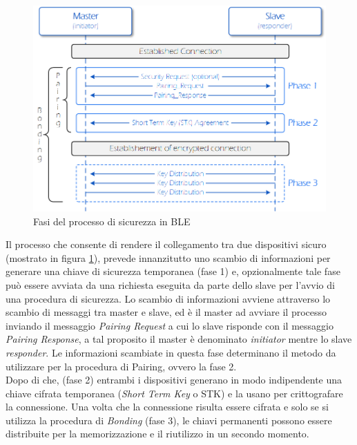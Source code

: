 \begin{figure}[!ht]
    \centering
    \includegraphics[width = \textwidth]{images/Pairing and Bonding.png}
    \caption{Fasi del processo di sicurezza in BLE}
    \label{fig:phasis_pairing_bonding}
\end{figure}

\noindent Il processo che consente di rendere il collegamento tra due dispositivi sicuro (mostrato in figura \ref{fig:phasis_pairing_bonding}), prevede innanzitutto uno scambio di informazioni per generare una chiave di sicurezza temporanea (fase 1) e, opzionalmente tale fase può essere avviata da una richiesta eseguita da parte dello slave per l'avvio di una procedura di sicurezza. Lo scambio di informazioni avviene attraverso lo scambio di messaggi tra master e slave, ed è il master ad avviare il processo inviando il messaggio \textit{Pairing Request} a cui lo slave risponde con il messaggio \textit{Pairing Response}, a tal proposito il master è denominato \textit{initiator} mentre lo slave \textit{responder}. Le informazioni scambiate in questa fase determinano il metodo da utilizzare per la procedura di Pairing, ovvero la fase 2.\\
Dopo di che, (fase 2) entrambi i dispositivi generano in modo indipendente una chiave cifrata temporanea (\textit{Short Term Key} o STK) e la usano per crittografare la connessione. 
Una volta che la connessione risulta essere cifrata e solo se si utilizza la procedura di \textit{Bonding} (fase 3), le chiavi permanenti possono essere distribuite per la memorizzazione e il riutilizzo in un secondo momento. 

